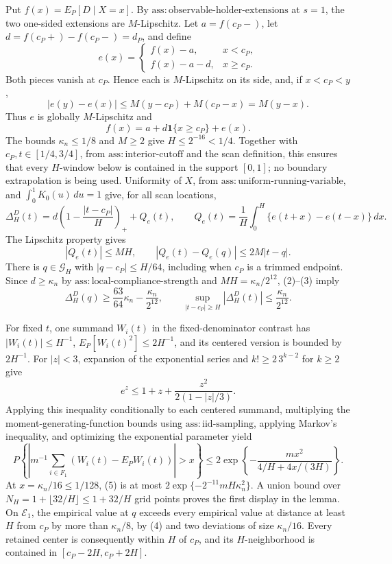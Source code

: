 Put \(f(x)=E_P[D\mid X=x]\).  By
\(\mathrm{ass:observable\mbox{-}holder\mbox{-}extensions}\) at
\(s=1\), the two one-sided extensions are \(M\)-Lipschitz.  Let
\(a=f(c_P-)\), let \(d=f(c_P+)-f(c_P-)=d_P\), and define
\[
 e(x)=\begin{cases}
 f(x)-a,&x<c_P,\\
 f(x)-a-d,&x\ge c_P.
 \end{cases}
\]
Both pieces vanish at \(c_P\).  Hence each is \(M\)-Lipschitz on its
side, and, if \(x<c_P<y\),
\[
 |e(y)-e(x)|\le M(y-c_P)+M(c_P-x)=M(y-x).
\]
Thus \(e\) is globally \(M\)-Lipschitz and
\[
 f(x)=a+d\mathbf 1\{x\ge c_P\}+e(x). \tag{1}
\]
The bounds \(\kappa_n\le1/8\) and \(M\ge2\) give
\(H\le2^{-16}<1/4\).  Together with
\(c_P,t\in[1/4,3/4]\), from
\(\mathrm{ass:interior\mbox{-}cutoff}\) and the scan definition, this
ensures that every \(H\)-window below is contained in the support
\([0,1]\); no boundary extrapolation is being used.
Uniformity of \(X\), from
\(\mathrm{ass:uniform\mbox{-}running\mbox{-}variable}\), and
\(\int_0^1K_0(u)\,du=1\) give, for all scan locations,
\[
 \Delta_H^D(t)=d\left(1-\frac{|t-c_P|}{H}\right)_++Q_e(t),
 \qquad
 Q_e(t)=\frac1H\int_0^H\{e(t+x)-e(t-x)\}\,dx. \tag{2}
\]
The Lipschitz property gives
\[
 |Q_e(t)|\le MH,
 \qquad |Q_e(t)-Q_e(q)|\le2M|t-q|. \tag{3}
\]
There is \(q\in\mathcal G_H\) with \(|q-c_P|\le H/64\), including
when \(c_P\) is a trimmed endpoint.  Since \(d\ge\kappa_n\) by
\(\mathrm{ass:local\mbox{-}compliance\mbox{-}strength}\) and
\(MH=\kappa_n/2^{12}\), (2)--(3) imply
\[
 \Delta_H^D(q)\ge\frac{63}{64}\kappa_n-\frac{\kappa_n}{2^{12}},
 \qquad
 \sup_{|t-c_P|\ge H}|\Delta_H^D(t)|
 \le\frac{\kappa_n}{2^{12}}. \tag{4}
\]

For fixed \(t\), one summand \(W_i(t)\) in the fixed-denominator
contrast has \(|W_i(t)|\le H^{-1}\),
\(E_P[W_i(t)^2]\le2H^{-1}\), and its centered version is bounded by
\(2H^{-1}\).  For \(|z|<3\), expansion of the exponential series and
\(k!\ge2\,3^{k-2}\) for \(k\ge2\) give
\[
 e^z\le1+z+\frac{z^2}{2(1-|z|/3)}.
\]
Applying this inequality conditionally to each centered summand,
multiplying the moment-generating-function bounds using
\(\mathrm{ass:iid\mbox{-}sampling}\), applying Markov's inequality,
and optimizing the exponential parameter yield
\[
 P\left\{\left|m^{-1}\sum_{i\in F_1}
       (W_i(t)-E_PW_i(t))\right|>x\right\}
 \le2\exp\left\{-\frac{mx^2}{4/H+4x/(3H)}\right\}. \tag{5}
\]
At \(x=\kappa_n/16\le1/128\), (5) is at most
\(2\exp\{-2^{-11}mH\kappa_n^2\}\).  A union bound over
\(N_H=1+\lfloor32/H\rfloor\le1+32/H\) grid points proves the first
display in the lemma.  On \(\mathcal E_1\), the empirical value at
\(q\) exceeds every empirical value at distance at least \(H\) from
\(c_P\) by more than \(\kappa_n/8\), by (4) and two deviations of
size \(\kappa_n/16\).  Every retained center is consequently within
\(H\) of \(c_P\), and its \(H\)-neighborhood is contained in
\([c_P-2H,c_P+2H]\).

